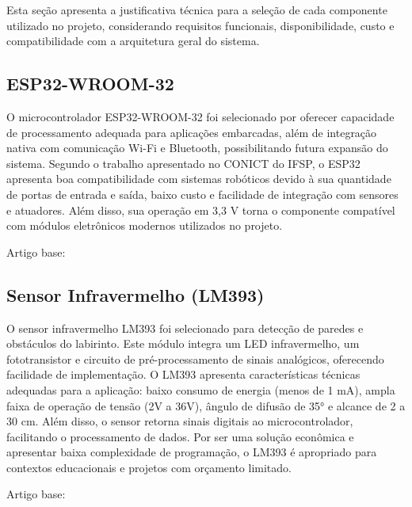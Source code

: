 Esta seção apresenta a justificativa técnica para a seleção de cada componente utilizado no projeto, considerando requisitos funcionais, disponibilidade, custo e compatibilidade com a arquitetura geral do sistema.

\subsection{ESP32-WROOM-32}

O microcontrolador ESP32-WROOM-32 foi selecionado por oferecer capacidade de processamento adequada para aplicações embarcadas, além de integração nativa com comunicação Wi-Fi e Bluetooth, possibilitando futura expansão do sistema. Segundo o trabalho apresentado no CONICT do IFSP, o ESP32 apresenta boa compatibilidade com sistemas robóticos devido à sua quantidade de portas de entrada e saída, baixo custo e facilidade de integração com sensores e atuadores. Além disso, sua operação em 3,3 V torna o componente compatível com módulos eletrônicos modernos utilizados no projeto.

Artigo base: \cite{oliveira2024_esp32_roboticar}

\subsection{Sensor Infravermelho (LM393)}

O sensor infravermelho LM393 foi selecionado para detecção de paredes e obstáculos do labirinto. Este módulo integra um LED infravermelho, um fototransistor e circuito de pré-processamento de sinais analógicos, oferecendo facilidade de implementação. O LM393 apresenta características técnicas adequadas para a aplicação: baixo consumo de energia (menos de 1 mA), ampla faixa de operação de tensão (2V a 36V), ângulo de difusão de 35° e alcance de 2 a 30 cm. Além disso, o sensor retorna sinais digitais ao microcontrolador, facilitando o processamento de dados. Por ser uma solução econômica e apresentar baixa complexidade de programação, o LM393 é apropriado para contextos educacionais e projetos com orçamento limitado.

Artigo base: \cite{lima2025_micromouse_lm393}




